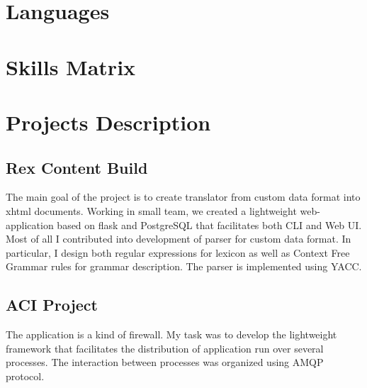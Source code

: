 \documentclass[11pt,a4paper,sans]{moderncv}        %
\begin{document}

\section{Languages}

\section{Skills Matrix}

\section{Projects Description}
\subsection{Rex Content Build}
The main goal of the project is to create translator from custom data format into xhtml documents.
Working in small team, we created a lightweight web-application based on flask and PostgreSQL that facilitates both CLI and Web UI. Most of all I contributed into development of parser for custom data format. In particular, I design both regular expressions for lexicon as well as Context Free Grammar rules for grammar description. The parser is implemented using YACC.
\subsection{ACI Project}
The application is a kind of firewall. My task was to develop the lightweight framework that facilitates the distribution of application run over several processes. The interaction between processes was organized using AMQP protocol.
\end{document}
